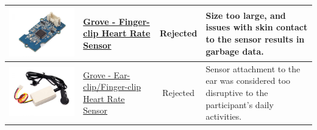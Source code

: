 \documentclass[12pt, titlepage]{article}
\begin{document}
\begin{table}[H]
\begin{tabular}{ | c | m{3cm} | c | m{7cm} |}
\hline
 \includegraphics[scale = 0.25]{grove1} & \href{https://www.seeedstudio.com/Grove-Finger-clip-Heart-Rate-Sensor.html?queryID=ad9334e40c7058a87ffd810044eecd1c&objectID=711&indexName=bazaar_retailer_products}{Grove - Finger-clip Heart Rate Sensor}  & Rejected & Size too large, and issues with skin contact to the sensor results in garbage data.\\
\hline
 \includegraphics[scale = 0.25]{grove2} & \href{https://www.seeedstudio.com/Grove-Ear-clip-Heart-Rate-Sensor.html?queryID=ad9334e40c7058a87ffd810044eecd1c&objectID=2143&indexName=bazaar_retailer_products}{Grove - Ear-clip/Finger-clip Heart Rate Sensor}  & Rejected & Sensor attachment to the ear was considered too disruptive to the participant's daily activities.\\

\end{tabular}
\end{table}
\end{document}
